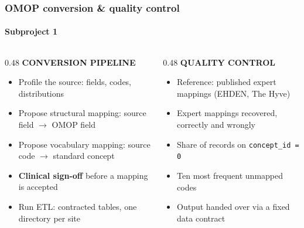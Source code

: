 \documentclass[aspectratio=169,11pt]{beamer}
\newcommand{\colhead}[1]{%
  {\scriptsize\bfseries\color{muted}\MakeUppercase{#1}}\par
  \vspace{0.25em}{\color{rulecol}\rule{\linewidth}{0.8pt}}\par\vspace{0.6em}}
\begin{document}
\begin{frame}
  \frametitle{OMOP conversion \& quality control}
  \framesubtitle{Subproject 1}
  \vspace{0.8em}
  \begin{columns}[t]
    \begin{column}{0.48\textwidth}
      \colhead{Conversion pipeline}
      \begin{itemize}
        \item Profile the source: fields, codes, distributions
        \item Propose structural mapping: source field $\rightarrow$ OMOP field
        \item Propose vocabulary mapping: source code $\rightarrow$ standard concept
        \item \textbf{Clinical sign-off} before a mapping is accepted
        \item Run ETL: contracted tables, one directory per site
      \end{itemize}
    \end{column}
    \begin{column}{0.48\textwidth}
      \colhead{Quality control}
      \begin{itemize}
        \item Reference: published expert mappings (EHDEN, The Hyve)
        \item Expert mappings recovered, correctly and wrongly
        \item Share of records on \texttt{concept\_id = 0}
        \item Ten most frequent unmapped codes
        \item Output handed over via a fixed data contract
      \end{itemize}
    \end{column}
  \end{columns}
\end{frame}
\end{document}

